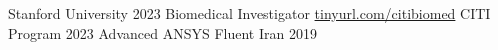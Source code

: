 \begin{cvhonors}
{   }
   {Stanford University}      %
   {2023}    %
\cvhonor
   {Biomedical Investigator}    %
   {
        \hfill
        \href{https://www.citiprogram.org/verify/?wcff7d1e2-7985-4cf3-bcf4-9d18a99ac9c8-55658490}{tinyurl.com/citibiomed}
        \hspace{\mystr}
   }
   {CITI Program}      %
   {2023}    %
\cvhonor
   {Advanced ANSYS Fluent}    %
   {}
   {Iran}    %
   {2019}    %

\end{cvhonors}



